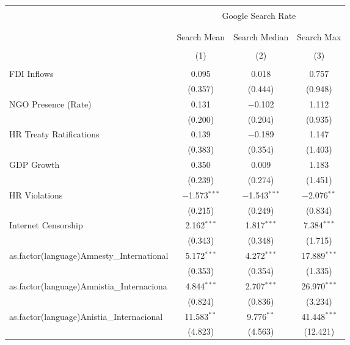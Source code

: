 
\begin{table}[!htbp] \centering 
  \caption{} 
  \label{} 
\begin{tabular}{@{\extracolsep{5pt}}lccc} 
\\[-1.8ex]\hline 
\hline \\[-1.8ex] 
 & \multicolumn{3}{c}{Google Search Rate} \\ 
\cline{2-4} 
\\[-1.8ex] & \multicolumn{3}{c}{ } \\ 
 & Search Mean & Search Median & Search Max \\ 
\\[-1.8ex] & (1) & (2) & (3)\\ 
\hline \\[-1.8ex] 
 FDI Inflows & 0.095 & 0.018 & 0.757 \\ 
  & (0.357) & (0.444) & (0.948) \\ 
  NGO Presence (Rate) & 0.131 & $-$0.102 & 1.112 \\ 
  & (0.200) & (0.204) & (0.935) \\ 
  HR Treaty Ratifications & 0.139 & $-$0.189 & 1.147 \\ 
  & (0.383) & (0.354) & (1.403) \\ 
  GDP Growth & 0.350 & 0.009 & 1.183 \\ 
  & (0.239) & (0.274) & (1.451) \\ 
  HR Violations & $-$1.573$^{***}$ & $-$1.543$^{***}$ & $-$2.076$^{**}$ \\ 
  & (0.215) & (0.249) & (0.834) \\ 
  Internet Censorship & 2.162$^{***}$ & 1.817$^{***}$ & 7.384$^{***}$ \\ 
  & (0.343) & (0.348) & (1.715) \\ 
  as.factor(language)Amnesty\_International & 5.172$^{***}$ & 4.272$^{***}$ & 17.889$^{***}$ \\ 
  & (0.353) & (0.354) & (1.335) \\ 
  as.factor(language)Amnistia\_Internaciona & 4.844$^{***}$ & 2.707$^{***}$ & 26.970$^{***}$ \\ 
  & (0.824) & (0.836) & (3.234) \\ 
  as.factor(language)Anistia\_Internacional & 11.583$^{**}$ & 9.776$^{**}$ & 41.448$^{***}$ \\ 
  & (4.823) & (4.563) & (12.421) \\ 

\end{tabular}
\end{table}
